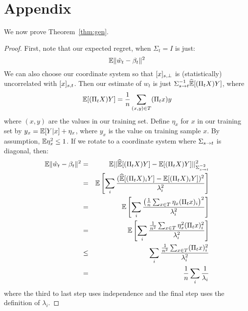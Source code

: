 \section{Appendix}
\label{app:proof}

We now prove Theorem~\ref{thm:gen}.

\begin{proof}
First, note that our expected regret, when $\Sigma_t = I$ is just:
\[
{\mathbb E} \| \hat w_t - \beta_t\|^2
\]
We can also choose our coordinate system so that ${[x]_{s,\perp}}$ is
(statistically) uncorrelated with ${[x]_{s,t}}$. Then our estimate of $w_t$
is just $ \Sigma_{s\rightarrow t}^{-1}\widehat {{\mathbb E}} [(\Pi_t X) Y]$, where 
\[
{\mathbb E} [(\Pi_t X) Y] = \frac{1}{n} \sum_{(x,y) \in T} (\Pi_t x) y
\]
where $(x,y)$ are the values in our training set.  Define $\eta_x$ for
$x$ in our training set by $y_x= {\mathbb E}[Y|x]+\eta_x$, where $y_x$ is the
value on training sample $x$.  By assumption, ${\mathbb E} \eta_x^2 \leq 1$.  If we rotate to a coordinate system where
$\Sigma_{s\rightarrow t}$ is diagonal, then:
\begin{eqnarray*}
{\mathbb E} \| \hat w_t - \beta_t\|^2 &=& 
{\mathbb E} ||\widehat {{\mathbb E}} [(\Pi_t X) Y] - {\mathbb E} [(\Pi_t X)Y]||_{\Sigma_{s\rightarrow t}^{-2}}^2\\
& = & {\mathbb E} \left[ \sum_i 
\frac{(\widehat {{\mathbb E}} [(\Pi_t X)_i Y] - {\mathbb E} [(\Pi_t
  X)_iY])^2}{\lambda_i^2}
\right]\\
& = & {\mathbb E}\left[ \sum_i 
\frac{ \left(\frac{1}{n} \sum_{x\in T} \eta_x (\Pi_t x)_i
  \right)^2}{\lambda_i^2}
\right]\\
& = & {\mathbb E} \left[ \sum_i 
\frac{ \frac{1}{n^2} \sum_{x\in T} \eta_x^2 (\Pi_t x)_i^2}{\lambda_i^2}
\right]\\
& \leq & \sum_i 
\frac{ \frac{1}{n^2} \sum_{x\in T} (\Pi_t x)_i^2}{\lambda_i^2}\\
& =& \frac{1}{n} \sum_i 
\frac{ 1}{\lambda_i}
\end{eqnarray*}
where the third to last step uses independence and the final step uses
the definition of $\lambda_i$.
\end{proof}
